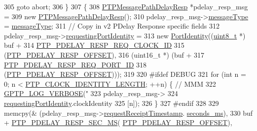 \begin{DoxyCode}
{{{{{{{305             \textcolor{keywordflow}{goto} abort;
306         \}
307         \{
308             \hyperlink{class_p_t_p_message_path_delay_resp}{PTPMessagePathDelayResp} *pdelay\_resp\_msg =
309                 \textcolor{keyword}{new} \hyperlink{class_p_t_p_message_path_delay_resp_a4634f817b11366bf78be956e0a2e2565}{PTPMessagePathDelayResp}();
310             pdelay\_resp\_msg->\hyperlink{class_p_t_p_message_common_adb32627aa5b0e2dbad3ccd88aab07c05}{messageType} = \hyperlink{class_p_t_p_message_common_adb32627aa5b0e2dbad3ccd88aab07c05}{messageType};
311             \textcolor{comment}{// Copy in v2 PDelay Response specific fields}
312             pdelay\_resp\_msg->\hyperlink{class_p_t_p_message_path_delay_resp_a27e69c7fb521ebffca13229a7c4658ce}{requestingPortIdentity} =
313                 \textcolor{keyword}{new} \hyperlink{class_port_identity}{PortIdentity}((\hyperlink{stdint_8h_aba7bc1797add20fe3efdf37ced1182c5}{uint8\_t} *) buf +
314                          \hyperlink{avbts__message_8hpp_a9c01e5eff56f505aca3f6f3deb6c34f1}{PTP\_PDELAY\_RESP\_REQ\_CLOCK\_ID}
315                          (\hyperlink{avbts__message_8hpp_a7c20f0e32d4408c124fa9e115ab32cf3}{PTP\_PDELAY\_RESP\_OFFSET}),
316                          (uint16\_t *) (buf +
317                                \hyperlink{avbts__message_8hpp_a1c5ac861894d1195aa57f60ef085798d}{PTP\_PDELAY\_RESP\_REQ\_PORT\_ID}
318                                (\hyperlink{avbts__message_8hpp_a7c20f0e32d4408c124fa9e115ab32cf3}{PTP\_PDELAY\_RESP\_OFFSET})));
319 
320 \textcolor{preprocessor}{#ifdef DEBUG}
321             \textcolor{keywordflow}{for} (\textcolor{keywordtype}{int} n = 0; n < \hyperlink{ptptypes_8hpp_afd1566058ed7927c2b790c9d4a0051ec}{PTP\_CLOCK\_IDENTITY\_LENGTH}; ++n) \{  \textcolor{comment}{// MMM}
322                 \hyperlink{gptp__log_8hpp_add03384a2a8099b27e07d041cce77e6f}{GPTP\_LOG\_VERBOSE}(\textcolor{stringliteral}{"%
323                     pdelay\_resp\_msg->
324                     \hyperlink{class_p_t_p_message_path_delay_resp_a27e69c7fb521ebffca13229a7c4658ce}{requestingPortIdentity}.clockIdentity
325                     [n]);
326             \}
327 \textcolor{preprocessor}{#endif}
328 
329             memcpy(& (pdelay\_resp\_msg->\hyperlink{class_p_t_p_message_path_delay_resp_a981c3fe148ecddf9f1091675650ccd48}{requestReceiptTimestamp}.
      \hyperlink{class_timestamp_a5d98378d782519e6f9c17db70f1620f0}{seconds\_ms}),
330                    buf + \hyperlink{avbts__message_8hpp_a5afc93370bc70d23f95f2acbe53749d8}{PTP\_PDELAY\_RESP\_SEC\_MS}(
      \hyperlink{avbts__message_8hpp_a7c20f0e32d4408c124fa9e115ab32cf3}{PTP\_PDELAY\_RESP\_OFFSET}),
}}}}}}}}
\end{DoxyCode}
